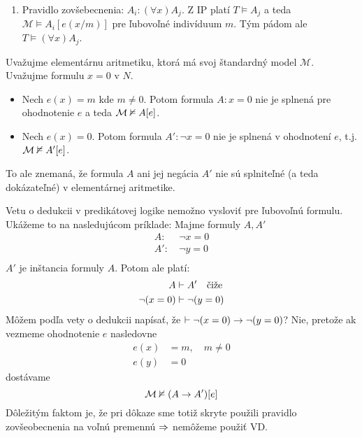 \begin{dokaz}
\begin{enumerate}
\begin{enumerate}
        \item Pravidlo zovšebecnenia: $A_i: (\forall x) A_j$.
            Z IP platí $T \models A_j $ a teda 
                $\mathcal{M} \models A_i[e(x/m)]$
            pre ľubovoľné indivíduum $m$. Tým pádom ale
            $T \models (\forall x) A_j$.
            
        \end{enumerate}
    \end{enumerate}
\end{dokaz}


\begin{priklad} %
    Uvažujme elementárnu aritmetiku, ktorá má svoj štandardný
    model $\mathcal{M}$. Uvažujme formulu $x=0$ v $N$.
    \begin{itemize}
        \item Nech $e(x) = m$ kde $m \neq 0$. Potom formula $A:x=0$ nie je
        splnená pre ohodnotenie $e$ a teda $\mathcal{M} \nvDash A[e]$.
        \item Nech $e(x) = 0$. Potom formula $A': \neg x=0$ nie je
        splnená v ohodnotení $e$, t.j. $\mathcal{M} \nvDash A'[e]$.
    \end{itemize}
    To ale znemaná, že formula $A$ ani jej negácia $A'$
    nie sú splniteľné (a teda dokázateľné) v elementárnej aritmetike.
\end{priklad}


\begin{poznamka} %
    Vetu o dedukcii v predikátovej logike nemožno vysloviť pre
    ľubovoľnú formulu. Ukážeme to na nasledujúcom príklade: Majme
    formuly $A,A'$
    \begin{align*}
            A :\ & \neg x=0 \\
            A':\ & \neg y=0 \\
    \end{align*}
    $A'$ je inštancia formuly $A$. Potom ale platí:
    \begin{align*}
            A &\vdash A'  \quad \mbox{čiže}\\
            \neg (x=0) &\vdash \neg (y=0)
    \end{align*}
    Môžem podľa vety o dedukcii napísať, že 
    $\vdash \neg (x=0) \rightarrow \neg (y=0)$? Nie, pretože ak
    vezmeme ohodnotenie $e$ nasledovne
    \begin{align*}
        e(x) &= m, \quad m \neq 0 \\
        e(y) &= 0
    \end{align*}
    dostávame
    \begin{equation*}
        \mathcal{M} \nvDash (A \rightarrow A')[e]
    \end{equation*}
    Dôležitým faktom je, že pri dôkaze sme totiž skryte použili
    pravidlo zovšeobecnenia na voľnú premennú $\Rightarrow$ nemôžeme použiť
    VD.
\end{poznamka}

